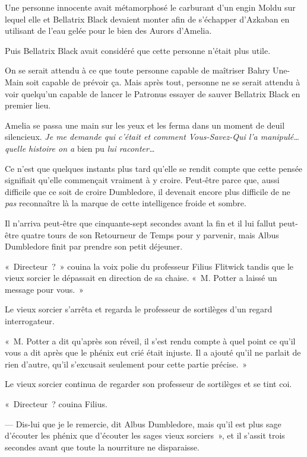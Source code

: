 Une personne innocente avait métamorphosé le carburant d'un engin Moldu sur lequel elle et Bellatrix Black devaient monter afin de s'échapper d'Azkaban en utilisant de l'eau gelée pour le bien des Aurors d'Amelia.

Puis Bellatrix Black avait considéré que cette personne n'était plus utile.

On se serait attendu à ce que toute personne capable de maîtriser Bahry Une-Main soit capable de prévoir ça. Mais après tout, personne ne se serait attendu à voir quelqu'un capable de lancer le Patronus essayer de sauver Bellatrix Black en premier lieu.

Amelia se passa une main sur les yeux et les ferma dans un moment de deuil silencieux. \emph{Je me demande qui c'était et comment Vous-Savez-Qui l'a manipulé… quelle histoire on a} bien pu \emph{lui raconter…}

Ce n'est que quelques instants plus tard qu'elle se rendit compte que cette pensée signifiait qu'elle commençait vraiment à y croire. Peut-être parce que, aussi difficile que ce soit de croire Dumbledore, il devenait encore plus difficile de ne \emph{pas} reconnaître là la marque de cette intelligence froide et sombre.


Il n'arriva peut-être que cinquante-sept secondes avant la fin et il lui fallut peut-être quatre tours de son Retourneur de Temps pour y parvenir, mais Albus Dumbledore finit par prendre son petit déjeuner.

«~Directeur~?~» couina la voix polie du professeur Filius Flitwick tandis que le vieux sorcier le dépassait en direction de sa chaise. «~M. Potter a laissé un message pour vous.~»

Le vieux sorcier s'arrêta et regarda le professeur de sortilèges d'un regard interrogateur.

«~M. Potter a dit qu'après son réveil, il s'est rendu compte à quel point ce qu'il vous a dit après que le phénix eut crié était injuste. Il a ajouté qu'il ne parlait de rien d'autre, qu'il s'excusait seulement pour cette partie précise.~»

Le vieux sorcier continua de regarder son professeur de sortilèges et se tint coi.

«~Directeur~? couina Filius.

--- Dis-lui que je le remercie, dit Albus Dumbledore, mais qu'il est plus sage d'écouter les phénix que d'écouter les sages vieux sorciers~», et il s'assit trois secondes avant que toute la nourriture ne disparaisse.

